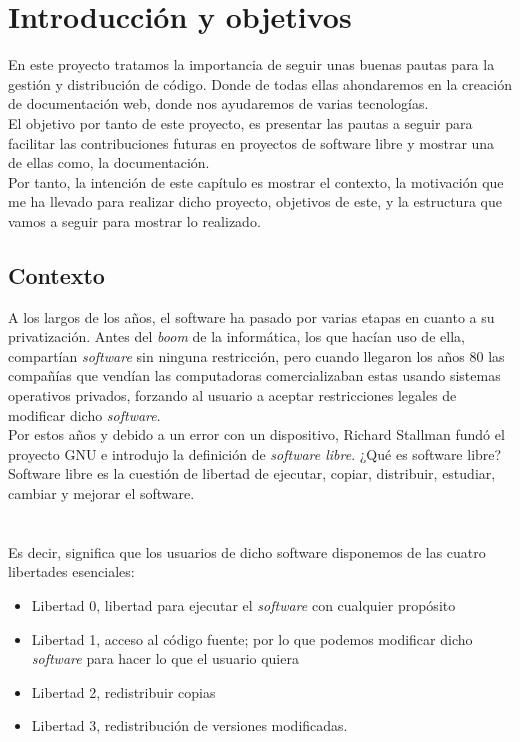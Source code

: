 \documentclass[a4paper, 12pt]{book}
\begin{document}
\tableofcontents


\chapter{Introducción y objetivos}
\label{chap:intro}
En este proyecto tratamos la importancia de seguir unas buenas pautas para la gestión y distribución de código. Donde de todas ellas ahondaremos en la creación de documentación web, donde nos ayudaremos de varias tecnologías. \\
El objetivo por tanto de este proyecto, es presentar las pautas a seguir para facilitar las contribuciones futuras en proyectos de software libre y mostrar una de ellas como, la documentación. \\
Por tanto, la intención de este capítulo es mostrar el contexto, la motivación que  me ha llevado para realizar dicho proyecto, objetivos de este, y la estructura que vamos a seguir para mostrar lo realizado.

\section{Contexto}
\label{sec:contex}
A los largos de los años, el software ha pasado por varias etapas en cuanto a su privatización. Antes del \emph{boom} de la informática, los que hacían uso de ella, compartían \emph{software} sin ninguna restricción, pero cuando llegaron los años 80 las compañías que vendían las computadoras comercializaban estas usando sistemas operativos privados, forzando al usuario a aceptar restricciones legales de modificar dicho \emph{software}. \\
Por estos años y debido a un error con un dispositivo, Richard Stallman fundó el proyecto GNU e introdujo la definición de \emph{software libre}. ¿Qué es software libre? Software libre es la cuestión de libertad de ejecutar, copiar, distribuir, estudiar, cambiar y mejorar el software. \\ \\ \\ 
Es decir, significa que los usuarios de dicho software disponemos de las cuatro libertades esenciales: 
\begin{itemize}
    \item Libertad 0, libertad para ejecutar el \emph{software} con cualquier propósito
    \item Libertad 1, acceso al código fuente; por lo que podemos modificar dicho \emph{software} para hacer lo que el usuario quiera
    \item Libertad 2, redistribuir copias 
    \item Libertad 3, redistribución de versiones modificadas.
\end{itemize}
\end{document}
